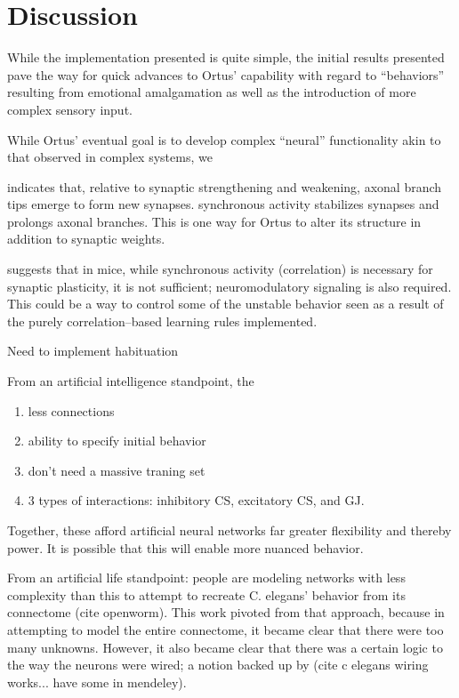 \documentclass[letterpaper]{article}
\begin{document}
\section{Discussion}
While the implementation presented is quite simple, the initial results presented pave the way for quick advances to Ortus' capability with regard to ``behaviors'' resulting from emotional amalgamation as well as the introduction of more complex sensory input.


While Ortus' eventual goal is to develop complex ``neural'' functionality akin to that observed in complex systems, we

\citet{Kutsarova2016} indicates that, relative to synaptic strengthening and weakening, axonal branch tips emerge to form new synapses. synchronous activity stabilizes synapses and prolongs axonal branches. This is one way for Ortus to alter its structure in addition to synaptic weights.

\cite{Johansens2014} suggests that in mice, while synchronous activity (correlation) is necessary for synaptic plasticity, it is not sufficient; neuromodulatory signaling is also required. This could be a way to control some of the unstable behavior seen as a result of the purely correlation--based learning rules implemented.


Need to implement habituation 

From an artificial intelligence standpoint, the

\begin{enumerate}
\item less connections
\item ability to specify initial behavior
\item don't need a massive traning set
\item 3 types of interactions: inhibitory CS, excitatory CS, and GJ.
\end{enumerate}

Together, these afford artificial neural networks far greater flexibility and thereby power. It is possible that this will enable more nuanced behavior.

From an artificial life standpoint: people are modeling networks with less complexity than this to attempt to recreate C. elegans' behavior from its connectome (cite openworm). This work pivoted from that approach, because in attempting to model the entire connectome, it became clear that there were too many unknowns. However, it also became clear that there was a certain logic to the way the neurons were wired; a notion backed up by (cite c elegans wiring works... have some in mendeley).
\end{document}
